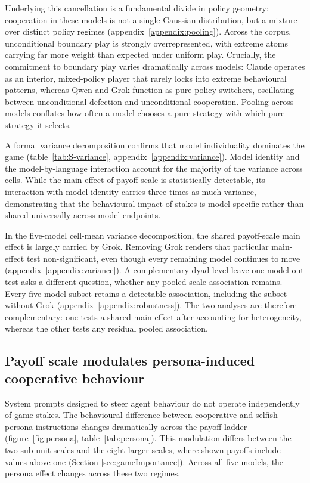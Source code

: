 \documentclass[11pt,a4paper]{article}
\begin{document}
Underlying this cancellation is a fundamental divide in policy geometry:
cooperation in these models is not a single Gaussian distribution, but a mixture
over distinct policy regimes (appendix~\ref{appendix:pooling}). Across the corpus,
unconditional boundary play is strongly overrepresented, with extreme atoms
carrying far more weight than expected under uniform play. Crucially, the commitment to boundary
play varies dramatically across models: Claude operates as an interior,
mixed-policy player that rarely locks into extreme  behavioural patterns, whereas Qwen and
Grok function as pure-policy switchers, oscillating between unconditional
defection and unconditional cooperation. Pooling across models conflates how
often a model chooses a pure strategy with which pure strategy it selects.

A formal variance decomposition confirms that model individuality dominates
the game (table~\ref{tab:S-variance}, appendix~\ref{appendix:variance}). Model
identity and the model-by-language interaction account for the majority of the
variance across cells. While the main effect of payoff scale is statistically
detectable, its interaction with model identity carries three times as much
variance, demonstrating that the behavioural impact of stakes is model-specific
rather than shared universally across model endpoints.

In the five-model cell-mean variance decomposition, the shared payoff-scale
main effect is largely carried by Grok. Removing Grok renders that particular
main-effect test non-significant, even though every remaining model continues
to move (appendix~\ref{appendix:variance}). A complementary dyad-level
leave-one-model-out test asks a different question, whether any pooled scale
association remains. Every five-model subset retains a detectable association,
including the subset without Grok (appendix~\ref{appendix:robustness}). The two
analyses are therefore complementary: one tests a shared main effect after
accounting for heterogeneity, whereas the other tests any residual pooled
association.

\subsection{Payoff scale modulates persona-induced cooperative behaviour}\label{sec:persona}

System prompts designed to steer agent behaviour do not operate independently of
game stakes. The behavioural difference between cooperative and selfish persona
instructions changes dramatically across the payoff ladder (figure~\ref{fig:persona},
table~\ref{tab:persona}). This modulation differs between the two sub-unit
scales and the eight larger scales, where shown payoffs include values above
one (Section \ref{sec:gameImportance}). Across all five models, the persona effect
changes across these two regimes.
\end{document}
